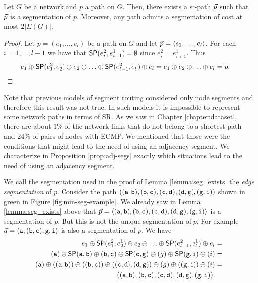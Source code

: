 \begin{lemma}
\label{lemma:seg_exists}
Let $G$ be a network and $p$ a path on $G$. Then, there exists a sr-path $\sr{p}$ such that $\sr{p}$ is a segmentation of
$p$. Moreover, any path admits a segmentation of cost at most $2|E(G)|$.
\end{lemma}

\begin{proof}
Let $p = (e_1, \ldots, e_l)$ be a path on $G$ and let $\sr{p} = \langle e_1, \ldots, e_l \rangle$. For each $i = 1, \ldots, l - 1$
we have that $\sp(e^2_i, e^1_{i + 1}) = \emptyset$ since $e^2_i = e^1_{i + 1}$. Thus
\begin{align*}
e_1 \oplus \sp(e^2_1, e^1_2) \oplus e_2 \oplus \ldots \oplus \sp(e^2_{l - 1}, e^1_l) \oplus e_l & = e_1 \oplus e_2 \oplus \ldots \oplus e_l = p.
\end{align*}
\end{proof}

Note that previous models of segment routing considered only node segments and therefore this result was not true. In such models it is impossible
to represent some network paths in terms of SR. As we saw in Chapter \ref{chapter:dataset}, there are about $1\%$ of the network links
that do not belong to a shortest path and $24\%$ of pairs of nodes with ECMP. We mentioned that those were the conditions that might lead to the
need of using an adjacency segment. We characterize in Proposition \ref{prop:adj-segs} exactly which situations lead to the need of using
an adjacency segment.

We call the segmentation used in the proof of Lemma \ref{lemma:seg_exists} the \emph{edge segmentation} of $p$.
Consider the path $((\node{a}, \node{b}), (\node{b}, \node{c}), (\node{c}, \node{d}), (\node{d}, \node{g}), (\node{g}, \node{i}))$ shown in green in Figure \ref{fig:min-seg-example}.
We already saw in Lemma \ref{lemma:seg_exists} above that $\sr{p} = \langle (\node{a}, \node{b}), (\node{b}, \node{c}), (\node{c}, \node{d}), (\node{d}, \node{g}), (\node{g}, \node{i}) \rangle$
is a segmentation of $p$. But this is not the unique segmentation of $p$. For example $\sr{q} = \langle \node{a}, (\node{b}, \node{c}), \node{g}, \node{i} \rangle$ is
also a segmentation of $p$. We have
\begin{align*}
e_1 \oplus \sp(e^2_1, e^1_2) \oplus e_2 \oplus \ldots \oplus \sp(e^2_{l - 1}, e^1_l) \oplus e_l & = \\
(\node{a}) \oplus \sp(\node{a}, \node{b}) \oplus (\node{b}, \node{c}) \oplus  \sp(\node{c}, \node{g}) \oplus (g) \oplus \sp(\node{g}, \node{i}) \oplus (i) & = \\
(\node{a}) \oplus ((\node{a}, \node{b})) \oplus ((\node{b}, \node{c})) \oplus  ((\node{c}, \node{d}), (\node{d}, \node{g})) \oplus (g) \oplus ((\node{g}, \node{i})) \oplus (i) & = \\
((\node{a}, \node{b}), (\node{b}, \node{c}), (\node{c}, \node{d}), (\node{d}, \node{g}), (\node{g}, \node{i})).
\end{align*}

